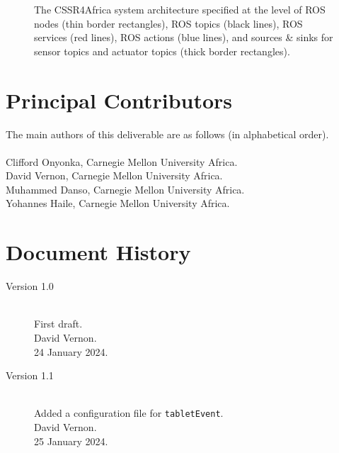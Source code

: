 \documentclass{CSSRforAfrica}
\newcommand{\blank}{~\\}
\begin{document}
{{\begin{figure}[thb]
\caption{The CSSR4Africa system architecture specified at the level of ROS nodes (thin border rectangles), ROS topics (black lines), ROS services (red lines), ROS actions (blue lines), and sources \& sinks for sensor topics and actuator topics (thick border rectangles).}  
\label{fig:architecture2}       
\end{figure}

\clearpage

\newpage




\pagebreak
\section*{Principal Contributors}
\label{contributors}
The main authors of this deliverable are as follows (in alphabetical order).
\blank
~
\blank
Clifford Onyonka, Carnegie Mellon University Africa.\\
David Vernon, Carnegie Mellon University Africa.\\
Muhammed Danso, Carnegie Mellon University Africa.\\
Yohannes Haile, Carnegie Mellon University Africa.\\

\newpage
\section*{Document History}
\label{document_history}

\begin{description}

\item [Version 1.0]~\\
First draft. \\
David Vernon. \\                          
24 January 2024.

\item [Version 1.1]~\\
Added a configuration file for {\small \verb+tabletEvent+}.\\
David Vernon. \\                          
25 January 2024.


\end{description}}}
\end{document}
